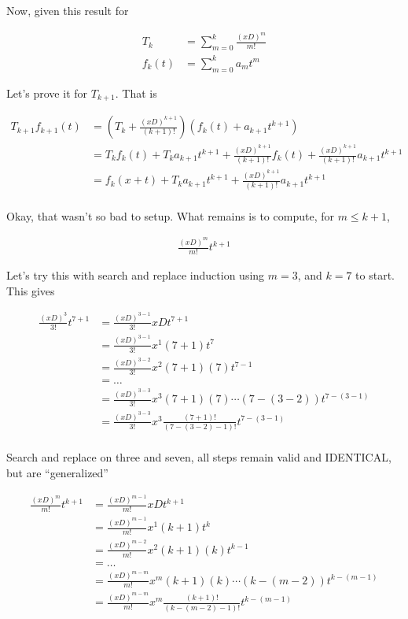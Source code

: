 Now, given this result for 

\begin{align*}
T_k &= \sum_{m=0}^k \frac{(xD)^m}{m!} \\
f_k(t) &= \sum_{m=0}^k a_m t^m
\end{align*}

Let's prove it for $T_{k+1}$.  That is

\begin{align*}
T_{k+1} f_{k+1}(t) 
&= 
\left( T_{k} + \frac{(xD)^{k+1}}{(k+1)!} \right) \left( f_{k}(t) + a_{k+1}t^{k+1} \right) \\
&=
T_{k} f_{k}(t) 
+T_{k} a_{k+1}t^{k+1} 
+\frac{(xD)^{k+1}}{(k+1)!} f_{k}(t) 
+\frac{(xD)^{k+1}}{(k+1)!} a_{k+1}t^{k+1} 
\\
&=
f_{k}(x + t) 
+T_{k} a_{k+1}t^{k+1} 
+\frac{(xD)^{k+1}}{(k+1)!} a_{k+1}t^{k+1} 
\\
\end{align*}

Okay, that wasn't so bad to setup.  What remains is to compute, for $m \le k+1$,

\begin{align*}
\frac{(xD)^{m}}{m!} t^{k+1} 
\end{align*}

Let's try this with search and replace induction using $m=3$, and $k=7$ to start.  This gives

\begin{align*}
\frac{(xD)^{3}}{3!} t^{7+1} 
&=
\frac{(xD)^{3-1}}{3!} xD t^{7+1} \\
&=
\frac{(xD)^{3-1}}{3!} x^1 (7+1) t^{7} \\
&=
\frac{(xD)^{3-2}}{3!} x^2 (7+1)(7) t^{7-1} \\
&=
\hdots \\
&=
\frac{(xD)^{3-3}}{3!} x^3 (7+1)(7) \cdots (7-(3-2)) t^{7-(3-1)} \\
&=
\frac{(xD)^{3-3}}{3!} x^3 \frac{(7+1)!}{(7-(3-2)-1)!} t^{7-(3-1)} \\
\end{align*}

Search and replace on three and seven, all steps remain valid and IDENTICAL, but are ``generalized''

\begin{align*}
\frac{(xD)^{m}}{m!} t^{k+1} 
&=
\frac{(xD)^{m-1}}{m!} xD t^{k+1} \\
&=
\frac{(xD)^{m-1}}{m!} x^1 (k+1) t^{k} \\
&=
\frac{(xD)^{m-2}}{m!} x^2 (k+1)(k) t^{k-1} \\
&=
\hdots \\
&=
\frac{(xD)^{m-m}}{m!} x^m (k+1)(k) \cdots (k-(m-2)) t^{k-(m-1)} \\
&=
\frac{(xD)^{m-m}}{m!} x^m \frac{(k+1)!}{(k-(m-2)-1)!} t^{k-(m-1)} \\
\end{align*}

